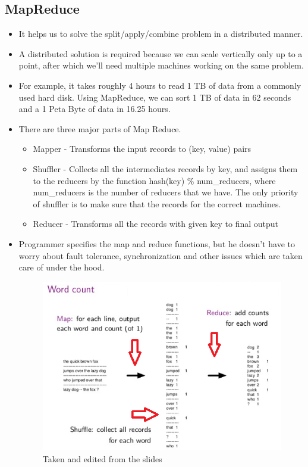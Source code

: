 \subsection{MapReduce}
\begin{itemize}
    \item It helps us to solve the split/apply/combine problem in a distributed manner.
    \item A distributed solution is required because we can scale vertically only up to a point, after which we'll need multiple machines working on the same problem.
    \item For example, it takes roughly 4 hours to read 1 TB of data from a commonly used hard disk. Using MapReduce, we can sort 1 TB of data in 62 seconds and a 1 Peta Byte of data in 16.25 hours.
    \item There are three major parts of Map Reduce.
    \begin{itemize}
        \item Mapper - Transforms the input records to (key, value) pairs
        \item Shuffler - Collects all the intermediates records by key, and assigns them to the reducers by the function hash(key) \% num\_reducers, where num\_reducers is the number of reducers that we have. The only priority of shuffler is to make sure that the records for the correct machines.
        \item Reducer - Transforms all the records with given key to final output
    \end{itemize}
    \item Programmer specifies the map and reduce functions, but he doesn't have to worry about fault tolerance, synchronization and other issues which are taken care of under the hood.
    \begin{figure}[ht]
    \begin{center}
        \includegraphics[width=1\textwidth]{images/wordcount.png}
        \caption{
            Taken and edited from the slides}
        \label{fig:example_figure}
    \end{center}
    \end{figure}
\end{itemize}



